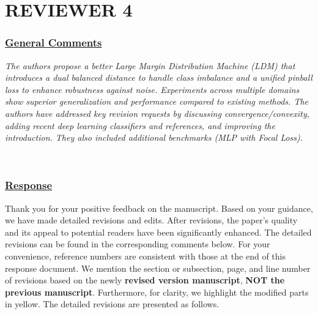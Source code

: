 \documentclass[journal,12pn, onecolumn]{IEEEtran}
\begin{document}
{{{%



\newpage

{\color{black}
\section*{\textbf{REVIEWER 4}}\label{rev4}}

{\color{black}
\subsubsection*{\underline{General Comments}}
\emph{The authors propose a better Large Margin Distribution Machine (LDM) that introduces a dual balanced distance to handle class imbalance and a unified pinball loss to enhance robustness against noise. Experiments across multiple domains show superior generalization and performance compared to existing methods. The authors have addressed key revision requests by discussing convergence/convexity, adding recent deep learning classifiers and references, and improving the introduction. They also included additional benchmarks (MLP with Focal Loss).}
}\\

{\color{black}
\subsubsection*{\textbf{\underline{Response}}}
Thank you for your positive feedback on the manuscript. Based on your guidance, we have made detailed revisions and edits. After revisions, the paper's quality and its appeal to potential readers have been significantly enhanced. The detailed revisions can be found in the corresponding comments below. For your convenience, reference numbers are consistent with those at the end of this response document. We mention the section or subsection, page, and line number of revisions based on the newly \textbf{revised version manuscript}, \textbf{NOT the previous manuscript}. Furthermore, for clarity, we highlight the modified parts in {\color{orange} yellow}. The detailed revisions are presented as follows.
}\\


}}}
\end{document}
